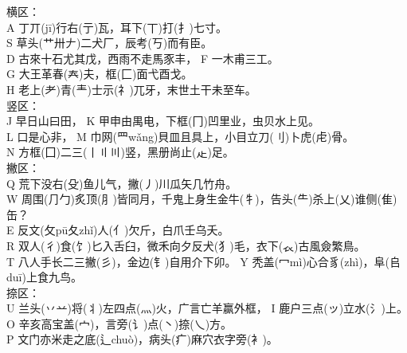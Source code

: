 \documentclass{ctexart}
\begin{document}
    \vspace{5mm}

        \fontsize{14pt}{14pt} \selectfont 

    \begin{multicols}{2}
    横区：\\
    A 丁丌(jī)行右(亍)瓦，耳下(丅)打(扌)七寸。\\
    S 草头(艹卅𠂇)二犬厂，辰考(丂)而有臣。\\
    D 古來十石尤其戊，西雨不走馬豕丰， F 一木甫三工。\\
    G 大王革春(𡗗)夫，框(匚)面弋酉戈。\\
    H 老上(耂)青(龶)士示(礻)兀牙，末世土干未至车。\\
    \vspace{12pt}
    竖区：\\
    J 早日山曰田， K 甲申由禺电，下框(冂)凹里业，虫贝水上见。\\
    L 口是心非， M 巾网(罒wǎng)貝皿且具上，小目立刀(刂)卜虎(虍)骨。\\
    N 方框(囗)二三(丨〢〣)竖，黑册尚止(龰)足。\\
    
    撇区：\\
    Q 荒下没右(殳)鱼儿气，撇(丿)川瓜矢几竹舟。 \\
    W 周围(⺆勹)炙顶(⺼)皆同月，千鬼上身生金牛(牜)，告头(⺧)杀上(乂)谁侧(隹)缶？\\
    E 反文(攵pū夂zhǐ)人(亻)欠斤，白爪壬乌夭。\\
    R 双人(彳)食(饣)匕入舌臼，微禾向夕反犬(犭)毛，衣下(𧘇)古風僉繁鳥。\\
    T 八人手长二三撇(彡)，金边(钅)自用介下卯。 Y 秃盖(冖mì)心合豸(zhì)，阜(𠂤duī)上食九鸟。\\
    \vspace{12pt}
    捺区：\\
    U 兰头(丷䒑)将(丬)左四点(灬)火，广言亡羊赢外框， I 鹿户三点(ッ)立水(氵)上。\\
    O 辛亥高宝盖(宀)，言旁(讠)点(丶)捺(乀)方。\\
    P 文门亦米走之底(辶chuò)，病头(疒)麻穴衣字旁(衤)。\\
        \end{multicols}
\end{document}
